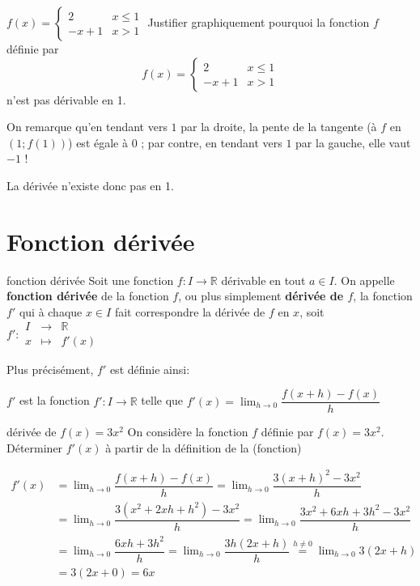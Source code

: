 \documentclass[a4paper,12pt]{article}
\begin{document}
\begin{exemple}
	$f(x)=\begin{cases} 2&  x \leq 1 \\ -x+1 & x>1 \end{cases}$
	\tcblower
	Justifier graphiquement pourquoi la fonction $f$ définie par \[f(x)=\begin{cases} 2 & x \leq 1 \\ -x+1 & x>1 \end{cases}\] n'est pas dérivable en 1.

On remarque qu'en tendant vers $1$ par la droite, la pente de la tangente (à $f$ en $(1;f(1))$) est égale à $0$ ; par contre, en tendant vers $1$ par la gauche, elle vaut $-1$ !

La dérivée n'existe donc pas en 1.
\end{exemple}

\section{Fonction dérivée}

\begin{definition}
	fonction dérivée
	\tcblower
Soit une fonction $f : I \to \mathbb{R}$ dérivable en tout $a \in I$.
On appelle {\bfseries fonction dérivée} de la fonction $f$, ou plus simplement {\bfseries dérivée de $f$}, la fonction $f'$ qui à chaque $x \in I$ fait correspondre la dérivée de $f$ en $x$, soit
$f' : \begin{array}{ccc} I & \to & \mathbb{R} \\ x & \mapsto & f'(x) \end{array}$

Plus précisément, $f'$ est définie ainsi:

$f'$ est la fonction $f' : I \to \mathbb{R}$ telle que $f'(x)=\displaystyle\lim_{h \to 0} \dfrac{f(x+h)-f(x)}{h}$
\end{definition}

\begin{exemple}
	dérivée de $f(x)=3x^2$
	\tcblower
On considère la fonction $f$ définie par $f(x)=3x^2$. Déterminer $f'(x)$ à partir de la définition de la (fonction)

$\begin{aligned}
	f'(x)&=\displaystyle\lim_{h \to 0} \dfrac{f(x+h)-f(x)}{h} = \displaystyle\lim_{h \to 0} \dfrac{3(x+h)^2-3x^2}{h} \\
	     &=\displaystyle\lim_{h \to 0} \dfrac{3(x^2+2xh+h^2)-3x^2}{h}
= \displaystyle\lim_{h \to 0} \dfrac{3x^2+6xh+3h^2-3x^2}{h}\\
	     &= \displaystyle\lim_{h \to 0} \dfrac{6xh+3h^2}{h} = \displaystyle\lim_{h \to 0} \dfrac{3h(2x+h)}{h}
\stackrel{h \neq 0}{=} \displaystyle\lim_{h \to 0} 3(2x+h)\\
	     &= 3(2x+0)=6x
\end{aligned}$
\end{exemple}
\end{document}
